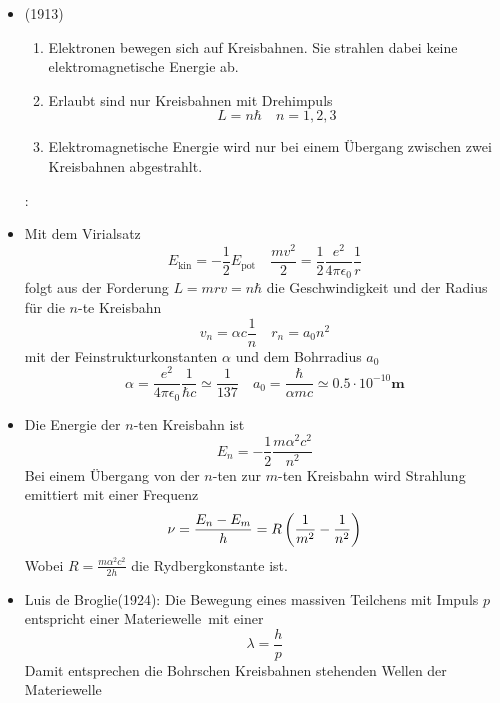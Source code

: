 \begin{itemize}
  \item {} (1913)
  \begin{enumerate}
    \item Elektronen bewegen sich auf Kreisbahnen. Sie strahlen dabei keine elektromagnetische Energie ab.
    \item Erlaubt sind nur Kreisbahnen mit Drehimpuls
    \begin{equation}
      L = n \hbar \quad n = 1,2,3
    \end{equation}
    \item Elektromagnetische Energie wird nur bei einem Übergang zwischen zwei Kreisbahnen abgestrahlt.
  \end{enumerate}
  :
  \item Mit dem Virialsatz
  \begin{equation}
    E_\text{kin} = - \frac{1}{2} E_\text{pot} \quad \frac{m v^2}{2} = \frac12 \frac{e^2}{4\pi\epsilon_0}\frac{1}{r}
  \end{equation}
  folgt aus der Forderung $L = m r v = n \hbar$ die Geschwindigkeit und der Radius für die $n$-te Kreisbahn
  \begin{equation}
    v_n = \alpha c \frac{1}{n} \quad r_n = a_0 n^2
  \end{equation}
  mit der Feinstrukturkonstanten $\alpha$ und dem Bohrradius $a_0$
  \begin{equation}
    \alpha = \frac{e^2}{4\pi\epsilon_0}\frac{1}{\hbar c} \simeq \frac{1}{137} \quad a_0 = \frac{\hbar}{\alpha m c} \simeq 0.5\cdot 10^{-10} \textbf{m}
  \end{equation}
\end{itemize}
\begin{figure}[H]
  \centering
  
\end{figure}
\begin{itemize}
  \item Die Energie der $n$-ten Kreisbahn ist
  \begin{equation}
    E_n = - \frac12 \frac{m\alpha^2c^2}{n^2}
  \end{equation}
  Bei einem Übergang von der $n$-ten zur $m$-ten Kreisbahn wird Strahlung emittiert mit einer Frequenz
  \begin{equation}
    \nu = \frac{E_n-E_m}{h} = R \left( \frac{1}{m^2} - \frac{1}{n^2} \right)
  \end{equation}
  Wobei $R = \frac{m\alpha^2c^2}{2 h}$ die Rydbergkonstante ist.
  \item Luis de Broglie(1924): Die Bewegung eines massiven Teilchens mit Impuls $p$ entspricht einer \glqq Materiewelle\grqq\ mit einer 
  \begin{equation}
    \lambda = \frac{h}{p}
  \end{equation}
  Damit entsprechen die Bohrschen Kreisbahnen stehenden Wellen der Materiewelle
\end{itemize}
\begin{figure}[H]
  \centering
  
\end{figure}

